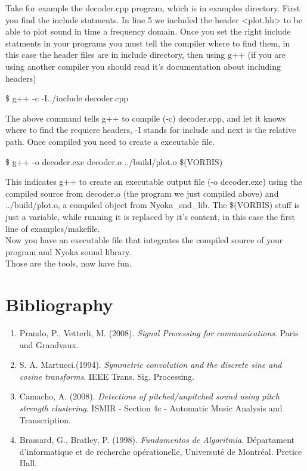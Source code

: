 \documentclass[letterpaper]{article}
\begin{document}
	Take for example the decoder.cpp program, which is in examples
directory. First you find the include statments. In line 5 we included
the header <plot.hh> to be able to plot sound in time a frequency domain.
Once you set the right include statments in your programs you must
tell the compiler where to find them, in this case the header files 
are in include directory, then using g++ (if you are using another
compiler you should read it's documentation about including headers)
\begin{center}
	\$ g++ -c -I../include decoder.cpp
\end{center}
The above command tells g++ to compile (-c) decoder.cpp, and let it knows
where to find the requiere headers, -I stands for include and next is 
the relative path. 
	Once compiled you need to create a executable file. 
\begin{center}
	\$ g++ -o decoder.exe decoder.o ../build/plot.o \$(VORBIS)
\end{center}
This indicates g++ to create an executable output file (-o decoder.exe)
using the compiled source from decoder.o (the program we just compiled above)
and ../build/plot.o, a compiled object from Nyoka\_snd\_lib. The \$(VORBIS)
stuff is just a variable, while running it is replaced by it's content,
in this case the first line of examples/makefile.\\
	Now you have an executable file that integrates the compiled
source of your program and Nyoka sound library.\\
Those are the tools, now have fun.

\section{Bibliography}
\begin{enumerate}
\item Prando, P., Vetterli, M. (2008). \textit{Signal Processing for communications}. Paris and Grandvaux.
\item S. A. Martucci.(1994). \textit{Symmetric convolution and the discrete sine and cosine transforms}. IEEE Trans. Sig. Processing. 
\item Camacho, A. (2008). \textit{Detections of pitched/unpitched sound using pitch strength  clustering}. ISMIR - Section 4c - Automatic Music Analysis and Transcription.
\item Brassard, G., Bratley, P. (1998). \textit{Fundamentos de Algoritmia}.  Départament d'informatique et de recherche opérationelle, Universuté de Montréal. Pretice Hall.
\end{enumerate}
\end{document}
